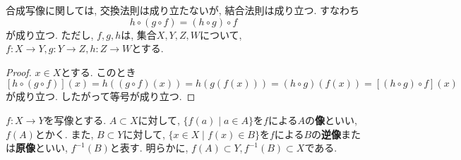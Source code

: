 \documentclass[a4j,dvipdfmx]{jsarticle}
\numberwithin{equation}{section}
\begin{document}
            合成写像に関しては, 交換法則は成り立たないが, 結合法則は成り立つ. すなわち
            \begin{equation}
                h\circ (g\circ f) = (h\circ g)\circ f \label{eq:集合論基礎:合成写像の結合法則}
            \end{equation}
            が成り立つ. ただし, $f,g,h$は, 集合$X,Y,Z,W$について, $f:X\rightarrow Y, g:Y\rightarrow Z, h:Z\rightarrow W$とする.
            \begin{proof}
                $x\in X$とする. このとき\[ [h\circ (g\circ f)](x)=h((g\circ f)(x))=h(g(f(x)))=(h\circ g)(f(x))=[(h\circ g)\circ f](x)\]
                が成り立つ. したがって等号が成り立つ.
            \end{proof}
            $f:X\rightarrow Y$を写像とする. $A\subset X$に対して, $\{f(a)\mid a\in A\}$を$f$による$A$の\textbf{像}といい, $f(A)$とかく. また, $B\subset Y$に対して, 
            $\{x\in X\mid f(x)\in B\}$を$f$による$B$の\textbf{逆像}または\textbf{原像}といい, $f^{-1}(B)$と表す. 明らかに, $f(A)\subset Y,f^{-1}(B)\subset X$である.
\end{document}
